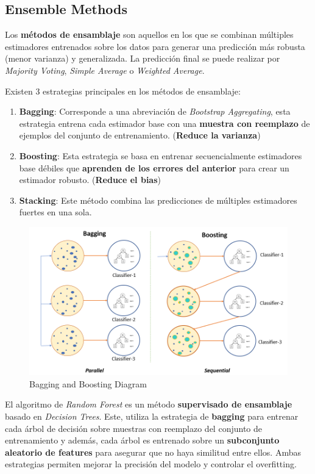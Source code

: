 \subsection{Ensemble Methods}

Los \textbf{métodos de ensamblaje} son aquellos en los que se combinan múltiples estimadores entrenados sobre los datos para generar una predicción más robusta (menor varianza) y generalizada. La predicción final se puede realizar por \textit{Majority Voting}, \textit{Simple Average} o \textit{Weighted Average}.

Existen 3 estrategias principales en los métodos de ensamblaje: 
\begin{enumerate}
    \item \textbf{Bagging}: Corresponde a una abreviación de \textit{Bootstrap Aggregating}, esta estrategia entrena cada estimador base con una \textbf{muestra con reemplazo} de ejemplos del conjunto de entrenamiento. (\textbf{Reduce la varianza})
    \item \textbf{Boosting}: Esta estrategia se basa en entrenar secuencialmente estimadores base débiles que \textbf{aprenden de los errores del anterior} para crear un estimador robusto. (\textbf{Reduce el bias})
    \item \textbf{Stacking}: Este método combina las predicciones de múltiples estimadores fuertes en una sola. 
\end{enumerate}

\begin{figure}[H]
    \center
    \includegraphics[scale=0.25]{notebooks/ML/img/bagging_and_boosting_diagram.png}
    \caption{Bagging and Boosting Diagram}
\end{figure}


El algoritmo de \textit{Random Forest} es un método \textbf{supervisado de ensamblaje} basado en \textit{Decision Trees}. Este, utiliza la estrategia de \textbf{bagging} para entrenar cada árbol de decisión sobre muestras con reemplazo del conjunto de entrenamiento y además, cada árbol es entrenado sobre un \textbf{subconjunto aleatorio de features} para asegurar que no haya similitud entre ellos. Ambas estrategias permiten mejorar la precisión del modelo y controlar el overfitting.

